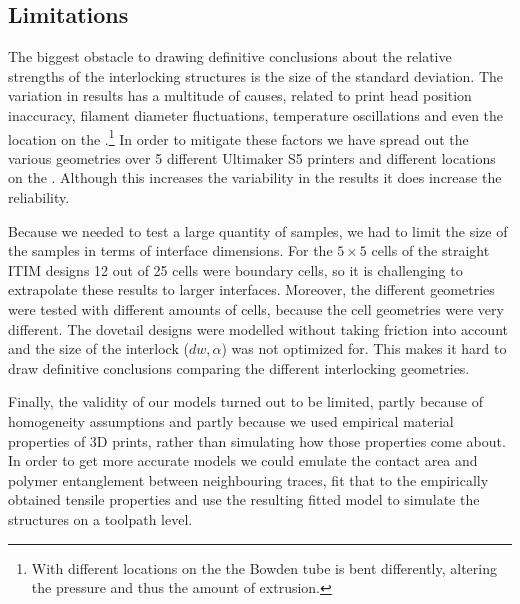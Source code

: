 \subsection{Limitations}
The biggest obstacle to drawing definitive conclusions about the relative strengths of the interlocking structures is the size of the standard deviation.
The variation in results has a multitude of causes, related to print head position inaccuracy, filament diameter fluctuations, temperature oscillations and even the location on the .\footnote{With different locations on the  the Bowden tube is bent differently, altering the pressure and thus the amount of extrusion.}
In order to mitigate these factors we have spread out the various geometries over 5 different Ultimaker S5 printers and different locations on the .
Although this increases the variability in the results it does increase the reliability.

Because we needed to test a large quantity of samples, we had to limit the size of the samples in terms of interface dimensions.
For the $5\times5$ cells of the straight ITIM designs 12 out of 25 cells were boundary cells, so it is challenging to extrapolate these results to larger interfaces.
Moreover, the different geometries were tested with different amounts of cells, because the cell geometries were very different.
The dovetail designs were modelled without taking friction into account and the size of the interlock ($dw, \alpha$) was not optimized for.
This makes it hard to draw definitive conclusions comparing the different interlocking geometries.

Finally, the validity of our models turned out to be limited,
partly because of homogeneity assumptions and partly because we used empirical material properties of 3D prints, rather than simulating how those properties come about.
In order to get more accurate models we could emulate the contact area and polymer entanglement between neighbouring traces,
fit that to the empirically obtained tensile properties and use the resulting fitted model to simulate the structures on a toolpath level.
